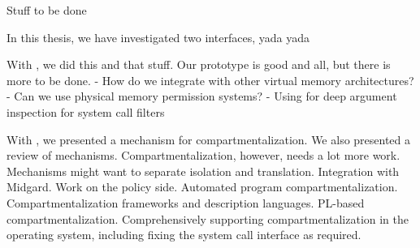 Stuff to be done

In this thesis, we have investigated two interfaces, yada yada

With \midas, we did this and that stuff.
Our prototype is good and all, but there is more to be done.
- How do we integrate with other virtual memory architectures?
- Can we use physical memory permission systems?
- Using \midas for deep argument inspection for system call filters

With \seccells, we presented a mechanism for compartmentalization.
We also presented a review of mechanisms.
Compartmentalization, however, needs a lot more work.
Mechanisms might want to separate isolation and translation.
Integration with Midgard.
Work on the policy side.
Automated program compartmentalization.
Compartmentalization frameworks and description languages.
PL-based compartmentalization.
Comprehensively supporting compartmentalization in the operating system,
including fixing the system call interface as required.
